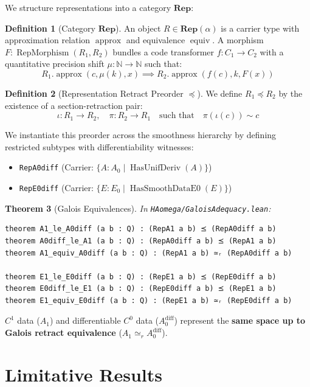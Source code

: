 \documentclass[11pt,a4paper]{article}
\newtheorem{theorem}{Theorem}[section]
\theoremstyle{definition}
\newtheorem{definition}[theorem]{Definition}
\theoremstyle{remark}
\newcommand{\Rep}{\ensuremath{\mathbf{Rep}}}
\newcommand{\N}{\ensuremath{\mathbb{N}}}
\newcommand{\simeqR}{\ensuremath{\simeq_r}}
\begin{document}
We structure representations into a category $\Rep$:
\begin{definition}[Category $\Rep$]
An object $R \in \Rep(\alpha)$ is a carrier type with approximation relation $\operatorname{approx}$ and equivalence $\operatorname{equiv}$. A morphism $F : \operatorname{RepMorphism}(R_1, R_2)$ bundles a code transformer $f : C_1 \to C_2$ with a quantitative precision shift $\mu : \N \to \N$ such that:
\[
R_1.\operatorname{approx}(c, \mu(k), x) \implies R_2.\operatorname{approx}(f(c), k, F(x))
\]
\end{definition}

\begin{definition}[Representation Retract Preorder $\preceq$]
We define $R_1 \preceq R_2$ by the existence of a section-retraction pair:
\[
\iota : R_1 \to R_2, \quad \pi : R_2 \to R_1 \quad \text{such that} \quad \pi(\iota(c)) \sim c
\]
\end{definition}

We instantiate this preorder across the smoothness hierarchy by defining restricted subtypes with differentiability witnesses:
\begin{itemize}
    \item \texttt{RepA0diff} (Carrier: $\{ A : A_0 \mid \operatorname{HasUnifDeriv}(A) \}$)
    \item \texttt{RepE0diff} (Carrier: $\{ E : E_0 \mid \operatorname{HasSmoothDataE0}(E) \}$)
\end{itemize}

\begin{theorem}[Galois Equivalences]
In \texttt{HAomega/GaloisAdequacy.lean}:
\begin{lstlisting}[language=Lean]
theorem A1_le_A0diff (a b : Q) : (RepA1 a b) ⪯ (RepA0diff a b)
theorem A0diff_le_A1 (a b : Q) : (RepA0diff a b) ⪯ (RepA1 a b)
theorem A1_equiv_A0diff (a b : Q) : (RepA1 a b) ≃ᵣ (RepA0diff a b)

theorem E1_le_E0diff (a b : Q) : (RepE1 a b) ⪯ (RepE0diff a b)
theorem E0diff_le_E1 (a b : Q) : (RepE0diff a b) ⪯ (RepE1 a b)
theorem E1_equiv_E0diff (a b : Q) : (RepE1 a b) ≃ᵣ (RepE0diff a b)
\end{lstlisting}
\end{theorem}
$C^1$ data ($A_1$) and differentiable $C^0$ data ($A_0^{\text{diff}}$) represent the \textbf{same space up to Galois retract equivalence} ($A_1 \simeqR A_0^{\text{diff}}$).

\section{Limitative Results}
\end{document}
